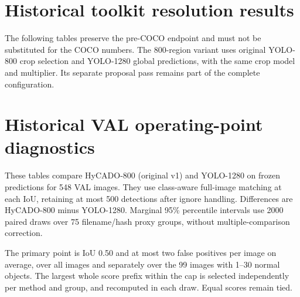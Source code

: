 \documentclass[10pt,letterpaper]{article}
\begin{document}
\section{Historical toolkit resolution results}
The following tables preserve the pre-COCO endpoint and must not be substituted for the COCO numbers. The 800-region variant uses original YOLO-800 crop selection and YOLO-1280 global predictions, with the same crop model and multiplier. Its separate proposal pass remains part of the complete configuration.
\begin{table}[h!]
\centering\footnotesize\setlength{\tabcolsep}{4pt}
\caption{Toolkit test-dev resolution extension. Macro AP is the equal-class toolkit diagnostic.}

\end{table}
\begin{table}[h!]
\centering\small
\caption{Toolkit AP contrasts for the resolution extension, with 1000 paired proxy-cluster draws.}

\end{table}
\clearpage
\begin{table}[h!]
\centering\small
\caption{Toolkit test-dev comparison including frozen SAHI-640. SAHI contrasts were bootstrapped only under the COCO definition.}

\end{table}
\begin{table}[h!]
\centering\small\setlength{\tabcolsep}{5pt}
\caption{Class-wise toolkit AP for the resolution extension. Differences are relative to YOLO-1280.}

\end{table}
\section{Historical VAL operating-point diagnostics}
These tables compare HyCADO-800 (original v1) and YOLO-1280 on frozen predictions for 548 VAL images. They use class-aware full-image matching at each IoU, retaining at most 500 detections after ignore handling. Differences are HyCADO-800 minus YOLO-1280. Marginal 95\% percentile intervals use 2000 paired draws over 75 filename/hash proxy groups, without multiple-comparison correction.

The primary point is IoU 0.50 and at most two false positives per image on average, over all images and separately over the 99 images with 1--30 normal objects. The largest whole score prefix within the cap is selected independently per method and group, and recomputed in each draw. Equal scores remain tied.
\begin{table}[h!]
\centering\footnotesize\setlength{\tabcolsep}{4.5pt}
\caption{Historical VAL matched-budget recall. YOLO denotes YOLO-1280; HyCADO denotes HyCADO-800. FP/I is realized false positives per image and R is recall (\%).}

\end{table}
\clearpage
\end{document}
